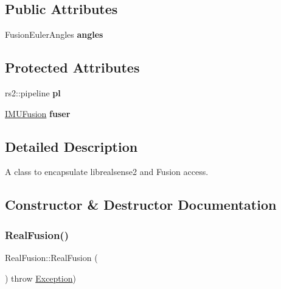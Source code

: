 \subsection*{Public Attributes}
\begin{DoxyCompactItemize}
\item 
\mbox{\label{classRealFusion_ab67b42c3cc2f4dffefa894d96b82751b}} 
Fusion\+Euler\+Angles {\bfseries angles}
\end{DoxyCompactItemize}
\subsection*{Protected Attributes}
\begin{DoxyCompactItemize}
\item 
\mbox{\label{classRealFusion_aa8e9a57cb02c2151f3783e88f8e0b662}} 
rs2\+::pipeline {\bfseries pl}
\item 
\mbox{\label{classRealFusion_a041aa40f221d98af87b4ebfc0138b83a}} 
\hyperlink{classIMUFusion}{I\+M\+U\+Fusion} {\bfseries fuser}
\end{DoxyCompactItemize}


\subsection{Detailed Description}
A class to encapsulate librealsense2 and Fusion access. 



\subsection{Constructor \& Destructor Documentation}
\mbox{\label{classRealFusion_a9632f71572a51d7db415793e1976a958}} 
\subsubsection{\texorpdfstring{Real\+Fusion()}{RealFusion()}}
{\footnotesize\ttfamily Real\+Fusion\+::\+Real\+Fusion (\begin{DoxyParamCaption}{ }\end{DoxyParamCaption}) throw  \hyperlink{classException}{Exception}) }



